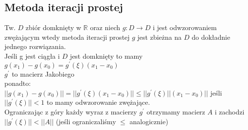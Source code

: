 \documentclass[twocolumn]{article}
\begin{document}
\begin{flushleft}
\section{Metoda iteracji prostej}
Tw. $D$ zbiór domknięty w $\mathbb{R}$ oraz niech $g:D\rightarrow D$ i jest odwzorowaniem zwężającym wtedy metoda iteracji prostej $g$ jest zbieżna na $D$ do dokładnie jednego rozwiązania.\\
Jeśli g jest ciągła i $D$ jest domknięty to mamy\\
$g(x_1) - g(x_0) = g^{\prime}(\xi)(x_1 - x_0)$\\
$g^{\prime}$ to macierz Jakobiego\\
ponadto:\\
$||g(x_1) - g(x_0)|| = ||g^{\prime}(\xi)(x_1 - x_0)|| \leq ||g^{\prime}(\xi)||(x_1 - x_0)||$
jeśli $||g^{\prime}(\xi)|| < 1$ to mamy odwzorowanie zwężające.\\
Ograniczając z góry każdy wyraz z macierzy $g^{\prime}$ otrzymamy macierz $A$ i zachodzi $||g^{\prime}(\xi)|| < ||A||$ (jeśli ograniczaliśmy $\leq$ analogicznie)
\end{flushleft}
\thispagestyle{empty}
\end{document}
